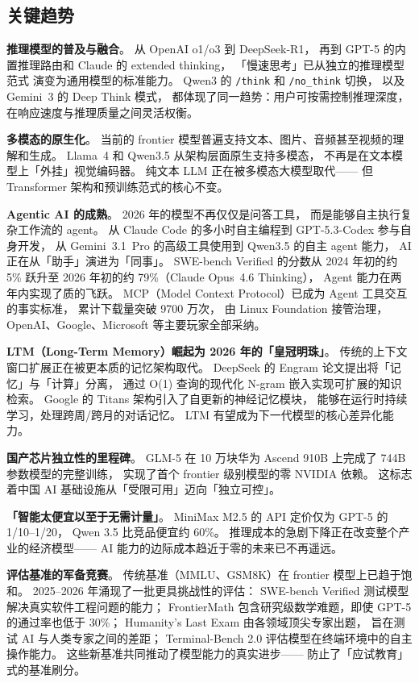 \subsection{关键趋势}

\textbf{推理模型的普及与融合}。
从 OpenAI o1/o3 到 DeepSeek-R1，
再到 GPT-5 的内置推理路由和 Claude 的 extended thinking，
「慢速思考」已从独立的推理模型范式
演变为通用模型的标准能力。
Qwen3 的 \texttt{/think} 和 \texttt{/no\_think} 切换，
以及 Gemini~3 的 Deep Think 模式，
都体现了同一趋势：用户可按需控制推理深度，
在响应速度与推理质量之间灵活权衡。

\textbf{多模态的原生化}。
当前的 frontier 模型普遍支持文本、图片、音频甚至视频的理解和生成。
Llama~4 和 Qwen3.5 从架构层面原生支持多模态，
不再是在文本模型上「外挂」视觉编码器。
纯文本 LLM 正在被多模态大模型取代——
但 Transformer 架构和预训练范式的核心不变。

\textbf{Agentic AI 的成熟}。
2026 年的模型不再仅仅是问答工具，
而是能够自主执行复杂工作流的 agent。
从 Claude Code 的多小时自主编程到 GPT-5.3-Codex 参与自身开发，
从 Gemini~3.1~Pro 的高级工具使用到 Qwen3.5 的自主 agent 能力，
AI 正在从「助手」演进为「同事」。
SWE-bench Verified 的分数从 2024 年初的约 5\%
跃升至 2026 年初的约 79\%（Claude Opus~4.6 Thinking），
Agent 能力在两年内实现了质的飞跃。
MCP（Model Context Protocol）已成为 Agent 工具交互的事实标准，
累计下载量突破 9700 万次，
由 Linux Foundation 接管治理，
OpenAI、Google、Microsoft 等主要玩家全部采纳。

\textbf{LTM（Long-Term Memory）崛起为 2026 年的「皇冠明珠」}。
传统的上下文窗口扩展正在被更本质的记忆架构取代。
DeepSeek 的 Engram 论文提出将「记忆」与「计算」分离，
通过 O(1) 查询的现代化 N-gram 嵌入实现可扩展的知识检索。
Google 的 Titans 架构引入了自更新的神经记忆模块，
能够在运行时持续学习，处理跨周/跨月的对话记忆。
LTM 有望成为下一代模型的核心差异化能力。

\textbf{国产芯片独立性的里程碑}。
GLM-5 在 10 万块华为 Ascend 910B 上完成了 744B 参数模型的完整训练，
实现了首个 frontier 级别模型的零 NVIDIA 依赖。
这标志着中国 AI 基础设施从「受限可用」迈向「独立可控」。

\textbf{「智能太便宜以至于无需计量」}。
MiniMax M2.5 的 API 定价仅为 GPT-5 的 1/10--1/20，
Qwen 3.5 比竞品便宜约 60\%。
推理成本的急剧下降正在改变整个产业的经济模型——
AI 能力的边际成本趋近于零的未来已不再遥远。

\textbf{评估基准的军备竞赛}。
传统基准（MMLU、GSM8K）在 frontier 模型上已趋于饱和。
2025--2026 年涌现了一批更具挑战性的评估：
SWE-bench Verified 测试模型解决真实软件工程问题的能力；
FrontierMath 包含研究级数学难题，即使 GPT-5 的通过率也低于 30\%；
Humanity's Last Exam 由各领域顶尖专家出题，
旨在测试 AI 与人类专家之间的差距；
Terminal-Bench 2.0 评估模型在终端环境中的自主操作能力。
这些新基准共同推动了模型能力的真实进步——
防止了「应试教育」式的基准刷分。

